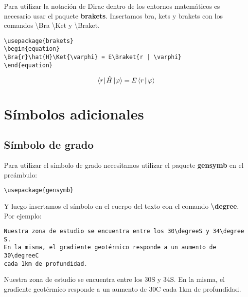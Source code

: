 \documentclass[a4paper,11pt]{article}
\begin{document}
Para utilizar la notación de Dirac dentro de los entornos matemáticos es necesario usar el paquete \textbf{brakets}. Insertamos bra, kets y brakets con los comandos \textbackslash Bra \textbackslash Ket y \textbackslash Braket.

\begin{verbatim}
\usepackage{brakets}
\begin{equation}
\Bra{r}\hat{H}\Ket{\varphi} = E\Braket{r | \varphi}
\end{equation}
\end{verbatim}

\begin{equation}
\Bra{r}\hat{H}\Ket{\varphi} =  E\Braket{r | \varphi}
\end{equation}

\section{Símbolos adicionales}

\subsection{Símbolo de grado}

Para utilizar el símbolo de grado necesitamos utilizar el paquete \textbf{gensymb} en el preámbulo:


\begin{verbatim}
\usepackage{gensymb}
\end{verbatim}

Y luego insertamos el símbolo en el cuerpo del texto con el comando \textbf{\textbackslash degree}. Por ejemplo:

\begin{verbatim}
Nuestra zona de estudio se encuentra entre los 30\degreeS y 34\degree S.
En la misma, el gradiente geotérmico responde a un aumento de 30\degreeC
cada 1km de profundidad.
\end{verbatim}

Nuestra zona de estudio se encuentra entre los 30\degree S y 34\degree S.
En la misma, el gradiente geotérmico responde a un aumento de 30\degree C
cada 1km de profundidad.
\end{document}
